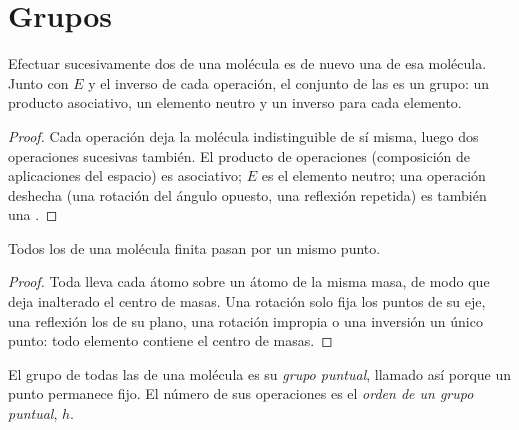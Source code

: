 \section{Grupos}

\begin{proposition}\label{prop:b3:point-groups:closure}
Efectuar sucesivamente dos  de una molécula es de nuevo una
 de esa molécula. Junto con $E$ y el inverso de
cada operación, el conjunto de las  es un grupo: un producto
asociativo, un elemento neutro y un inverso para cada elemento.
\end{proposition}

\begin{proof}
Cada operación deja la molécula indistinguible de sí misma, luego dos operaciones
sucesivas también. El producto de operaciones (composición de aplicaciones del espacio)
es asociativo; $E$ es el elemento neutro; una operación deshecha (una rotación del
ángulo opuesto, una reflexión repetida) es también una .
\end{proof}

\begin{proposition}\label{prop:b3:point-groups:fixed-point}
Todos los  de una molécula finita pasan por un mismo punto.
\end{proposition}

\begin{proof}
Toda  lleva cada átomo sobre un átomo de la misma masa, de modo que
deja inalterado el centro de masas. Una rotación solo fija los puntos de su
eje, una reflexión los de su plano, una rotación impropia o una inversión
un único punto: todo elemento contiene el centro de masas.
\end{proof}

\begin{definition}\label{def:b3:point-groups:point-group}
El grupo de todas las  de una molécula es su \emph{grupo
puntual}, llamado así porque un punto permanece fijo. El número de
sus operaciones es el \emph{orden de un grupo puntual},
$h$.
\end{definition}

